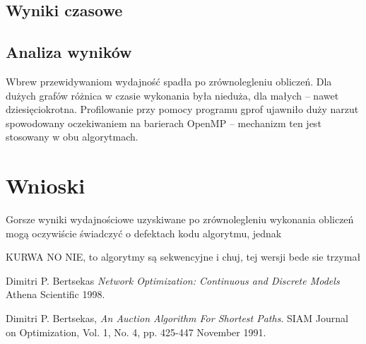 \documentclass {article}
\begin{document}
\subsection{Wyniki czasowe}



\subsection{Analiza wyników}

Wbrew przewidywaniom wydajność spadła po zrównolegleniu obliczeń. Dla dużych grafów różnica w czasie wykonania była nieduża, dla małych -- nawet dziesięciokrotna. Profilowanie przy pomocy programu gprof ujawniło duży narzut spowodowany oczekiwaniem na barierach OpenMP -- mechanizm ten jest stosowany w obu algorytmach.

\section{Wnioski}

Gorsze wyniki wydajnościowe uzyskiwane po zrównolegleniu wykonania obliczeń mogą oczywiście świadczyć o defektach kodu algorytmu, jednak 


KURWA NO NIE, to algorytmy są sekwencyjne i chuj, tej wersji bede sie trzymał

\begin{thebibliography}{9}

        Dimitri P. Bertsekas
        \emph{Network Optimization: Continuous and Discrete Models}
        Athena Scientific
        1998.

        Dimitri P. Bertsekas,
        \emph{An Auction Algorithm For Shortest Paths}.
        SIAM Journal on Optimization,
        Vol. 1, No. 4, pp. 425-447
        November 1991.
      
\end{thebibliography}
\end{document}
